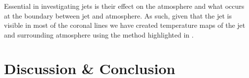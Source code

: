 \documentclass{emulateapj}
\begin{document}
Essential in investigating jets is their effect on the atmosphere and what occurs at the boundary between jet and atmosphere.
As such, given that the jet is visible in most of the coronal lines we have created temperature maps of the jet and surrounding atmosphere using the method highlighted in \cite{Leonard2014}.







\section{Discussion \& Conclusion}





\end{document}
